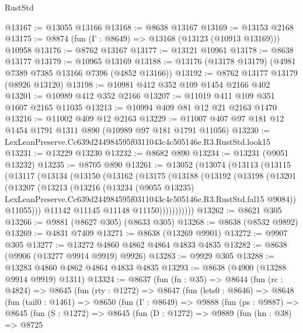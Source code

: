 \begin{lexlean}{RustStd}
\begin{coremodule}
@13167 := @13055 @13166
@13168 := @8638 @13167
@13169 := @13153 @2168
@13175 := @8874 (fun (Γ : @8649) => @13168 (@13123 (@10913 @13169))) @10958
@13176 := @8762 @13167
@13177 := @13121 @10961
@13178 := @8638 @13177
@13179 := @10965 @13169
@13188 := @13176 (@13178 @13179) (@4981 @7389 @7385 @13166 @7396 (@4852 @13166))
@13192 := @8762 @13177 @13179 (@8926 @13120)
@13198 := @10981 @412 @352 @109 @1454 @2166 @402
@13201 := @10989 @412 @352 @2166
@13207 := @11019 @411 @109 @351 @1607 @2165 @11035
@13213 := @10994 @409 @81 @12 @21 @2163 @1470
@13216 := @11002 @409 @12 @2163
@13229 := @11007 @407 @97 @181 @12 @1454 @1791 @1311 @890 (@10989 @97 @181 @1791 @11056)
@13230 := LexLeanPreserve.Cc639d244984595f0311043c4c505146e.R3.RustStd.look15
@13231 := @13229 @13230
@13232 := @8682 @890
@13234 := @13231 (@9051 @13232)
@13235 := @8705 @890
@13261 := @13052
    (@13074
      (@13113
        (@13115
          (@13117
            (@13134
              (@13150
                (@13162
                  (@13175
                    (@13188
                      (@13192
                        (@13198
                          (@13201
                            (@13207
                              (@13213
                                (@13216
                                  (@13234
                                    (@9055 @13235)
                                    LexLeanPreserve.Cc639d244984595f0311043c4c505146e.R3.RustStd.fal15
                                    @9084))
                                @11055)))
                          @11142
                          @11145
                          @11148
                          @11150)))))))))))
@13262 := @8621 @305
@13266 := @9881 (@8627 @305) (@8633 @305)
@13268 := @8638 (@8532 @9892)
@13269 := @4831 @7409
@13271 := @8638 (@13269 @9901)
@13272 := @9907 @305
@13277 := @13272 @4860 @4862 @4864 @4833 @4835
@13282 := @8638 (@9906 (@13277 @9914 @9919) @9926)
@13283 := @9929 @305
@13288 := @13283 @4860 @4862 @4864 @4833 @4835
@13293 := @8638 (@4900 (@13288 @9914 @9919) @1311)
@13324 := @8637
    (fun (fn : @35) =>
    @8644
      (fun (rc : @4824) =>
      @8645
        (fun (rty : @1272) =>
        @8647
          (fun (lets0 : @8646) =>
          @8648
            (fun (tail0 : @1461) =>
            @8650
              (fun (Γ : @8649) =>
              @9888
                (fun (ps : @9887) =>
                @8645
                  (fun (S : @1272) =>
                  @8645
                    (fun (D : @1272) =>
                    @9889
                      (fun (hn : @38) =>
                      @8725

\end{coremodule}
\end{lexlean}
